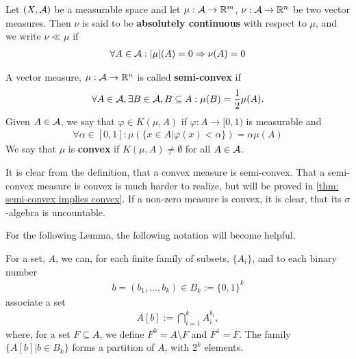 \documentclass[../../main.tex]{subfiles}
\begin{document}

\begin{definition}
Let $(X, \mathcal{A})$ be a measurable space and let $\mu: \mathcal{A} \to \mathbb{R}^{m}$, $\nu: \mathcal{A} \to \mathbb{R}^{n}$ be two vector measures. Then $\nu$ is said to be \textbf{absolutely continuous} with respect to $\mu$, and we write $\nu \ll \mu$ if
\begin{align*}
	\forall A\in \mathcal{A} : |\mu|(A) = 0 \Rightarrow \nu(A) = 0
\end{align*}
\end{definition}



\begin{definition}\label{def: convex measure} %
A vector measure, $\mu:\mathcal{A} \to \mathbb{R}^{n}$ is called \textbf{semi-convex} if
\begin{align*}
	\forall A \in \mathcal{A}, \exists B \in \mathcal{A}, B\subseteq A : \mu(B) = \frac{1}{2} \mu(A).
\end{align*}
Given $A\in \mathcal{A}$, we say that $\varphi \in K(\mu, A)$ if $\varphi:A \to [0,1)$ is measurable and
\begin{align*}
	\forall \alpha \in [0,1] : \mu(\{x\in A | \varphi(x) < \alpha \}) = \alpha\mu(A)
\end{align*}
We say that $\mu$ is \textbf{convex} if $K(\mu, A)\neq \emptyset$ for all $A\in \mathcal{A}$.
\end{definition}

It is clear from the definition, that a convex measure is semi-convex. That a semi-convex measure is convex is much harder to realize, but will be proved in \ref{thm: semi-convex implies convex}. If a non-zero measure is convex, it is clear, that its $\sigma$-algebra is uncountable.

For the following Lemma, the following notation will become helpful.
\begin{definition}
For a set, $A$, we can, for each finite family of subsets, $\{A_{i}\}$, and to each binary number
\begin{align*}
	b=(b_{1}, \dots, b_{k}) \in B_{k}:=\{0, 1\}^{k}
\end{align*}
associate a set
\begin{align*}
	A[b] := \bigcap_{i=1}^{k} A_{i}^{b_{i}},
\end{align*}
where, for a set $F\subseteq A$, we define $F^{0}=A\setminus F$ and $F^{1}=F$. The family $\{A[b] | b\in B_{k}\}$ forms a partition of $A$, with $2^{k}$ elements.
\end{definition}
\end{document}
